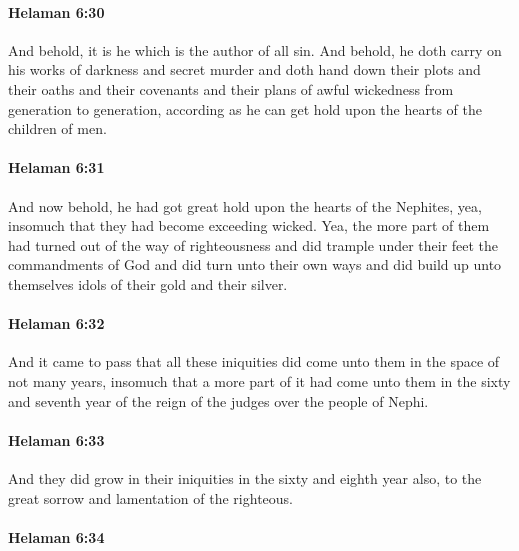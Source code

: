 		\paragraph{Helaman 6:30} %
			\label{HELAMAN-6-30}

			And behold, it is he which is the author of all sin.
			And behold, he doth carry on his works of darkness and secret murder
			and doth hand down their plots and their oaths
			and their covenants and their plans of awful wickedness
			from generation to generation,
			according as he can get hold upon the hearts of the children of men.

		\paragraph{Helaman 6:31} %
			\label{HELAMAN-6-31}

			And now behold, he had got great hold upon the hearts of the Nephites,
			yea, insomuch that they had become exceeding wicked.
			Yea, the more part of them had turned out of the way of righteousness
			and did trample under their feet the commandments of God
			and did turn unto their own ways
			and did build up unto themselves idols of their gold and their silver.

		\paragraph{Helaman 6:32} %
			\label{HELAMAN-6-32}

			And it came to pass that all these iniquities did come unto them
			in the space of not many years,
			insomuch that a more part of it had come unto them
			in the sixty and seventh year of the reign of the judges over the people of Nephi.

		\paragraph{Helaman 6:33} %
			\label{HELAMAN-6-33}

			And they did grow in their iniquities in the sixty and eighth year also,
			to the great sorrow and lamentation of the righteous.

		\paragraph{Helaman 6:34} %
			\label{HELAMAN-6-34}

